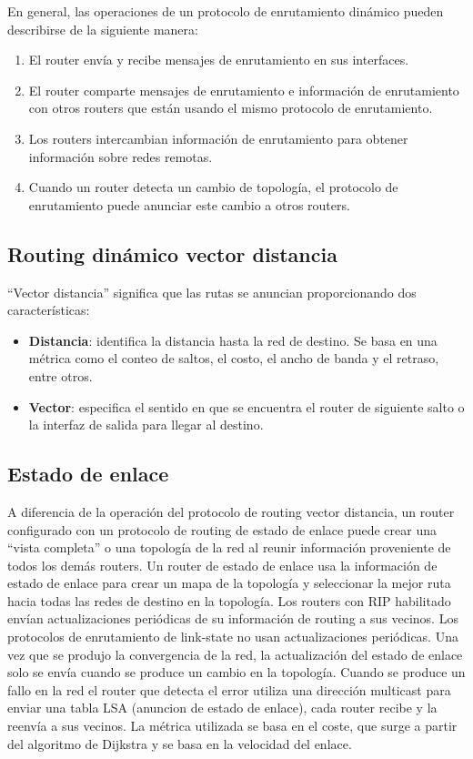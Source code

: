 \documentclass[
	12pt, %
	fleqn, %
	a4paper, %
	oneside, %
]{LegrandOrangeBook}
\begin{document}
En general, las operaciones de un protocolo de enrutamiento dinámico pueden
describirse de la siguiente manera:
\begin{enumerate}
\item El router envía y recibe mensajes de enrutamiento en sus interfaces.
\item El router comparte mensajes de enrutamiento e información de enrutamiento con otros routers que están usando el mismo protocolo de enrutamiento.
\item Los routers intercambian información de enrutamiento para obtener información sobre redes remotas.
\item Cuando un router detecta un cambio de topología, el protocolo de enrutamiento puede anunciar este cambio a otros routers.
\end{enumerate}
\subsection{Routing dinámico vector distancia}
“Vector distancia” significa que las rutas se anuncian proporcionando dos
características:
\begin{itemize}
\item \textbf{Distancia}: identifica la distancia hasta la red de destino. Se basa en una métrica como el conteo de saltos, el costo, el ancho de banda y el retraso, entre otros.
\item \textbf{Vector}: especifica el sentido en que se encuentra el router de siguiente salto o la interfaz de salida para llegar al destino.
\end{itemize}
\subsection{Estado de enlace}
A diferencia de la operación del protocolo de routing vector distancia, un router configurado con un protocolo de routing de estado de enlace puede crear una ``vista completa'' o una topología de la red al reunir información proveniente de todos los demás routers. Un router de estado de enlace usa la información de estado de enlace para crear un mapa de la topología y seleccionar la mejor ruta hacia todas las redes de destino en la topología. Los routers con RIP habilitado envían actualizaciones periódicas de su información de routing a sus vecinos. Los protocolos de enrutamiento de link-state no usan actualizaciones periódicas. Una vez que se produjo la convergencia de la red, la actualización del estado de enlace solo se envía cuando se produce un cambio en la topología. Cuando se produce un fallo en la red el router que detecta el error utiliza una dirección multicast para enviar una tabla LSA (anuncion de estado de enlace), cada router recibe y la reenvía a sus vecinos. La métrica utilizada se basa en el coste, que surge a partir del algoritmo de Dijkstra y se basa en la velocidad del enlace.
\end{document}
